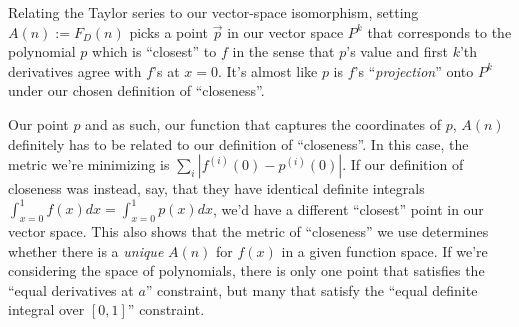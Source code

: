 \documentclass[letterpaper,12pt]{report}
\begin{document}
Relating the Taylor series to our vector-space isomorphism,
setting \(A(n) := F_D(n)\) picks a point \(\vec{p}\) in our vector space \(P^k\) that corresponds
to the polynomial \(p\) which is ``closest'' to \(f\)
in the sense that \(p\)'s value and first \(k\)'th derivatives agree with \(f\)'s at \(x=0\).
It's almost like \(p\) is \(f\)'s ``\emph{projection}'' onto \(P^k\) under our chosen
definition of ``closeness''.\par
Our point \(p\) \textemdash{} and as such, our function that captures the
coordinates of \(p\), \(A(n)\) \textemdash{}
definitely has to be related to our definition of ``closeness''.
In this case, the metric we're minimizing is
\(\sum_i|f^{(i)}(0) - p^{(i)}(0)|\).
If our definition of closeness was instead, say, that they have identical definite integrals
\( \int_{x=0}^{1}f(x)dx = \int_{x=0}^{1}p(x)dx \),
we'd have a different ``closest'' point in our vector space.
This also shows that the metric of ``closeness'' we use determines whether there is a
\emph{unique} \(A(n)\) for \(f(x)\) in a given function space. If we're considering the space
of polynomials, there is only one point that satisfies the ``equal derivatives at \(a\)''
constraint, but many that satisfy the ``equal definite integral over \([0,1]\)'' constraint.



\end{document}
